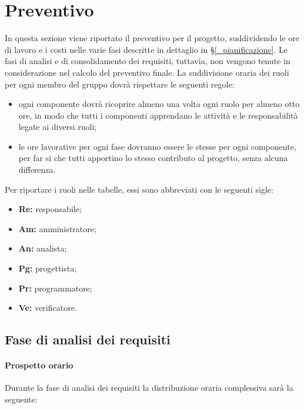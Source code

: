 \section{Preventivo} \label{_preventivo}
In questa sezione viene riportato il preventivo per il progetto, suddividendo le ore di lavoro e i costi nelle varie fasi descritte in dettaglio in \S\ref{_pianificazione}.
Le fasi di analisi e di consolidamento dei requisiti, tuttavia, non vengono tenute in considerazione nel calcolo del preventivo finale.
La suddivisione oraria dei ruoli per ogni membro del gruppo dovrà rispettare le seguenti regole:
\begin{itemize}
	\item ogni componente dovrà ricoprire almeno una volta ogni ruolo per almeno otto ore, in modo che tutti i componenti apprendano le attività e le responsabilità legate ai diversi ruoli;
	\item le ore lavorative per ogni fase dovranno essere le stesse per ogni componente, per far si che tutti apportino lo stesso contributo al progetto, senza alcuna differenza.
\end{itemize}
Per riportare i ruoli nelle tabelle, essi sono abbreviati con le seguenti sigle:
\begin{itemize}
	\item\textbf{Re:} responsabile;
	\item\textbf{Am:} amministratore;
	\item\textbf{An:} analista;
	\item\textbf{Pg:} progettista;
	\item\textbf{Pr:} programmatore;
	\item\textbf{Ve:} verificatore.
\end{itemize}

\subsection{Fase di analisi dei requisiti}

\paragraph{Prospetto orario}
Durante la fase di analisi dei requisiti la distribuzione oraria complessiva sarà la seguente:

